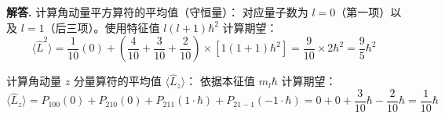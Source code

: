 \documentclass[12pt, a4paper, oneside]{ctexart}
\newenvironment{solution}{\par\noindent\textbf{解答. }}{\par}
\begin{document}
\begin{solution}
    计算角动量平方算符的平均值（守恒量）：
    对应量子数为 $l=0$（第一项）以及 $l=1$（后三项）。使用特征值 $l(l+1)\hbar^2$ 计算期望：
    \begin{equation*}
        \langle \hat{L}^2 \rangle = \frac{1}{10}(0) + \left(\frac{4}{10} + \frac{3}{10} + \frac{2}{10}\right) \times [1(1+1)\hbar^2] = \frac{9}{10} \times 2\hbar^2 = \frac{9}{5}\hbar^2
    \end{equation*}
    
    计算角动量 $z$ 分量算符的平均值 $\langle \hat{L}_z \rangle$：
    依据本征值 $m_l\hbar$ 计算期望：
    \begin{equation*}
        \langle \hat{L}_z \rangle = P_{100}(0) + P_{210}(0) + P_{211}(1\cdot\hbar) + P_{21-1}(-1\cdot\hbar) = 0 + 0 + \frac{3}{10}\hbar - \frac{2}{10}\hbar = \frac{1}{10}\hbar
    \end{equation*}
\end{solution}
\end{document}
